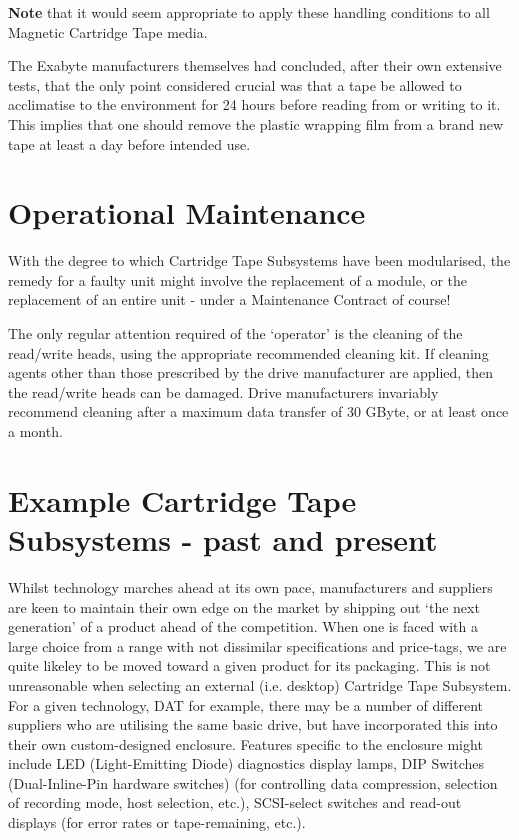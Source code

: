 \documentclass[11pt]{article}
\begin{document}
{\bf Note} that it would seem appropriate to apply these handling conditions to
all Magnetic Cartridge Tape media.

The Exabyte manufacturers themselves had concluded, after their own extensive
tests, that the only point considered crucial was that a tape be allowed to
acclimatise to the environment for 24 hours before reading from or writing
to it. This implies that one should remove the plastic wrapping film from a
brand new tape at least a day before intended use.

\section {Operational Maintenance}

With the degree to which Cartridge Tape Subsystems have been modularised,
the remedy for a faulty unit might involve the replacement of a module, or
the replacement of an entire unit - under a Maintenance Contract of course!

The only regular attention required of the `operator' is the cleaning of the
read/write heads, using the appropriate recommended cleaning kit. If cleaning
agents other than those prescribed by the drive manufacturer are applied,
then the read/write heads can be damaged. Drive manufacturers invariably
recommend cleaning after a maximum data transfer of 30 GByte, or at least
once a month.

\section {Example Cartridge Tape Subsystems - past and present}

Whilst technology marches ahead at its own pace, manufacturers and suppliers
are keen to maintain their own edge on the market by shipping out `the next
generation' of a product ahead of the competition. When one is faced with a
large choice from a range with not dissimilar specifications and price-tags,
we are quite likeley to be moved toward a given product for its packaging.
This is not unreasonable when selecting an external (i.e. desktop) Cartridge
Tape Subsystem. For a given technology, DAT for example, there may be a
number of different suppliers who are utilising the same basic drive, but
have incorporated this into their own custom-designed enclosure. Features
specific to the enclosure might include LED (Light-Emitting Diode) diagnostics
display lamps, DIP Switches (Dual-Inline-Pin hardware switches) (for
controlling data compression, selection of recording mode, host selection,
etc.), SCSI-select switches and read-out displays (for error rates or
tape-remaining, etc.).
\end{document}
